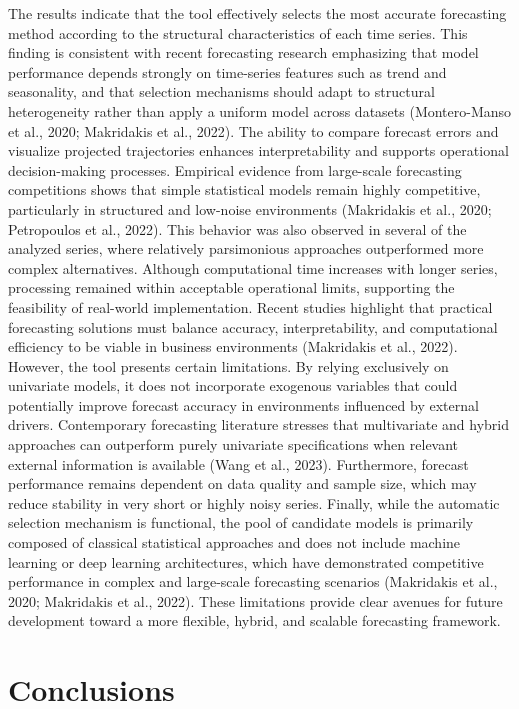 \documentclass[journal,article,submit,pdftex,moreauthors]{Definitions/mdpi}
\begin{document}
The results indicate that the tool effectively selects the most accurate forecasting method according to the structural characteristics of each time series. This finding is consistent with recent forecasting research emphasizing that model performance depends strongly on time-series features such as trend and seasonality, and that selection mechanisms should adapt to structural heterogeneity rather than apply a uniform model across datasets (Montero-Manso et al., 2020; Makridakis et al., 2022).
The ability to compare forecast errors and visualize projected trajectories enhances interpretability and supports operational decision-making processes. Empirical evidence from large-scale forecasting competitions shows that simple statistical models remain highly competitive, particularly in structured and low-noise environments (Makridakis et al., 2020; Petropoulos et al., 2022). This behavior was also observed in several of the analyzed series, where relatively parsimonious approaches outperformed more complex alternatives.
Although computational time increases with longer series, processing remained within acceptable operational limits, supporting the feasibility of real-world implementation. Recent studies highlight that practical forecasting solutions must balance accuracy, interpretability, and computational efficiency to be viable in business environments (Makridakis et al., 2022).
However, the tool presents certain limitations. By relying exclusively on univariate models, it does not incorporate exogenous variables that could potentially improve forecast accuracy in environments influenced by external drivers. Contemporary forecasting literature stresses that multivariate and hybrid approaches can outperform purely univariate specifications when relevant external information is available (Wang et al., 2023).
Furthermore, forecast performance remains dependent on data quality and sample size, which may reduce stability in very short or highly noisy series. Finally, while the automatic selection mechanism is functional, the pool of candidate models is primarily composed of classical statistical approaches and does not include machine learning or deep learning architectures, which have demonstrated competitive performance in complex and large-scale forecasting scenarios (Makridakis et al., 2020; Makridakis et al., 2022).
These limitations provide clear avenues for future development toward a more flexible, hybrid, and scalable forecasting framework.
\section{Conclusions}
\end{document}
